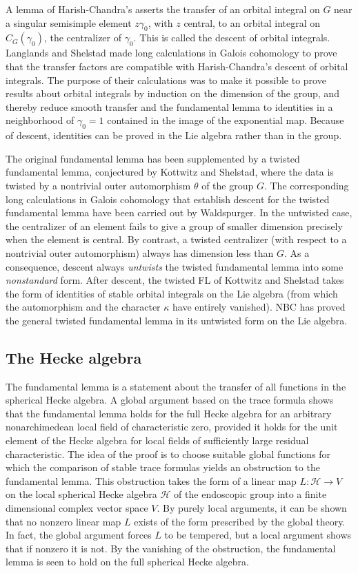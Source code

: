 \documentclass[brochure,english,12pt]{bourbaki}
\begin{document}
A lemma of Harish-Chandra's asserts the transfer of an orbital
integral on $G$ near a singular semisimple element $z\gamma_0$, with
$z$ central, to an orbital integral on $C_G(\gamma_0)$, the
centralizer of $\gamma_0$.  This is called the descent of orbital
integrals.  Langlands and Shelstad made long calculations in
Galois cohomology to prove that the transfer factors are compatible
with Harish-Chandra's descent of orbital integrals.  The purpose of
their calculations was to make it possible to prove results about
orbital integrals by induction on the dimension of the group, and
thereby reduce smooth transfer and the fundamental lemma to identities
in a neighborhood of $\gamma_0=1$ contained in the image of the
exponential map.  Because of descent, identities can be proved in the
Lie algebra rather than in the group.


The original fundamental lemma has been supplemented by a twisted
fundamental lemma, conjectured by Kottwitz and Shelstad, where the
data is twisted by a nontrivial outer automorphism $\theta$ of the
group $G$.  The corresponding long calculations in Galois cohomology
that establish descent for the twisted fundamental lemma have been
carried out by Waldspurger.  In the untwisted case, the centralizer of
an element fails to give a group of smaller dimension precisely when
the element is central.  By contrast, a twisted centralizer (with
respect to a nontrivial outer automorphism) always has dimension less
than $G$.  As a consequence, descent always {\it untwists} the twisted
fundamental lemma into some {\it nonstandard} form.  After descent, the
twisted FL of Kottwitz and Shelstad takes the form of identities of
stable orbital integrals on the Lie algebra (from which the
automorphism and the character $\kappa$ have entirely vanished).  NBC
has proved the general twisted fundamental lemma in its untwisted form
on the Lie algebra.


\subsection{The Hecke algebra}

The fundamental lemma is a statement about the transfer of all
functions in the spherical Hecke algebra.  A global argument based on
the trace formula shows that the fundamental lemma holds for the full
Hecke algebra for an arbitrary nonarchimedean local field of
characteristic zero, provided it holds for the unit element of the
Hecke algebra for local fields of sufficiently large residual
characteristic.  The idea of the proof is to choose suitable global
functions for which the comparison of stable trace formulas yields an
obstruction to the fundamental lemma.  This obstruction takes the form
of a linear map $L:{\mathcal H}\to V$ on the local spherical Hecke
algebra ${\mathcal H}$ of the endoscopic group into a finite
dimensional complex vector space $V$.  By purely local arguments, it
can be shown that no nonzero linear map $L$ exists of the form
prescribed by the global theory.  In fact, the global argument forces $L$
to be tempered, but a local argument shows that if nonzero it is not.
By the vanishing of the obstruction,
the fundamental lemma is seen to hold on the full spherical Hecke algebra.
\end{document}
